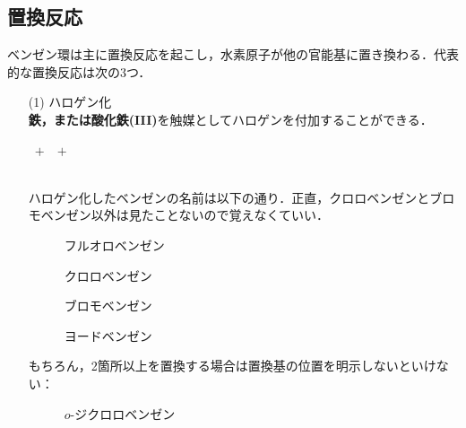 \documentclass[a4paper,12pt]{ltjsreport}
\begin{document}
\subsection{置換反応}
ベンゼン環は主に置換反応を起こし，水素原子が他の官能基に置き換わる．代表的な置換反応は次の3つ．
\begin{itemize}
    \item [(1)]ハロゲン化\\
    \textbf{鉄，または酸化鉄(III)}を触媒としてハロゲンを付加することができる．\\[5pt]
    \centerline{~$+$~~$+$~}\\[5pt]
    ハロゲン化したベンゼンの名前は以下の通り．正直，クロロベンゼンとブロモベンゼン以外は見たことないので覚えなくていい．\\
\begin{minipage}{0.5\linewidth}
\begin{figure}[H]
    \centering
       \caption{フルオロベンゼン}
\end{figure}
\end{minipage}
\begin{minipage}{0.5\linewidth}
\begin{figure}[H]
    \centering
            \caption{クロロベンゼン}
\end{figure}
\end{minipage}
\begin{minipage}{0.5\linewidth}
\begin{figure}[H]
\centering
       \caption{ブロモベンゼン}
\end{figure}
\end{minipage}
\begin{minipage}{0.5\linewidth}
\begin{figure}[H]
    \centering
            \caption{ヨードベンゼン}
\end{figure}
\end{minipage}
もちろん，2箇所以上を置換する場合は置換基の位置を明示しないといけない：\\
\begin{minipage}{0.35\linewidth}
\begin{figure}[H]
    \centering
\caption{$o$-ジクロロベンゼン} 
\end{figure}
\end{minipage}
\begin{minipage}{0.35\linewidth}

\end{minipage}
\end{itemize}
\end{document}
